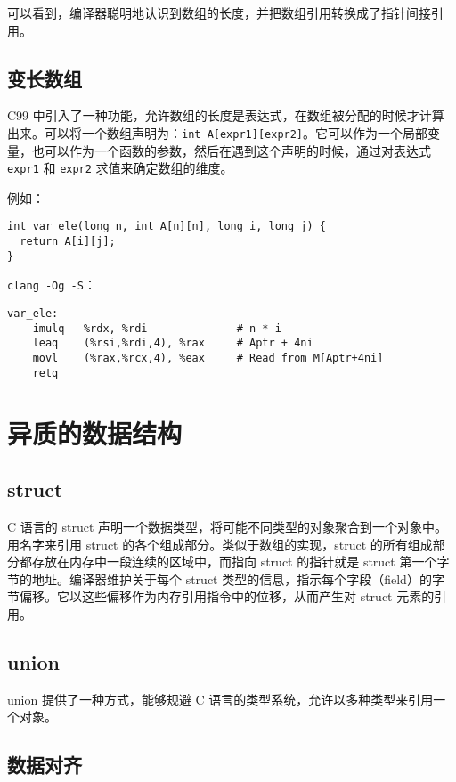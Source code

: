 可以看到，编译器聪明地认识到数组的长度，并把数组引用转换成了指针间接引用。

\subsection{变长数组}

C99 中引入了一种功能，允许数组的长度是表达式，在数组被分配的时候才计算出来。可以将一个数组声明为：\verb|int A[expr1][expr2]|。它可以作为一个局部变量，也可以作为一个函数的参数，然后在遇到这个声明的时候，通过对表达式 \verb|expr1| 和 \verb|expr2| 求值来确定数组的维度。

例如：
\begin{verbatim}
int var_ele(long n, int A[n][n], long i, long j) {
  return A[i][j];
}
\end{verbatim}
\verb|clang -Og -S|：
\begin{verbatim}
var_ele:
    imulq   %rdx, %rdi              # n * i
    leaq    (%rsi,%rdi,4), %rax     # Aptr + 4ni
    movl    (%rax,%rcx,4), %eax     # Read from M[Aptr+4ni]
    retq
\end{verbatim}

\section{异质的数据结构}

\subsection{struct}

C 语言的 struct 声明一个数据类型，将可能不同类型的对象聚合到一个对象中。用名字来引用 struct 的各个组成部分。类似于数组的实现，struct 的所有组成部分都存放在内存中一段连续的区域中，而指向 struct 的指针就是 struct 第一个字节的地址。编译器维护关于每个 struct 类型的信息，指示每个字段（field）的字节偏移。它以这些偏移作为内存引用指令中的位移，从而产生对 struct 元素的引用。

\subsection{union}

union 提供了一种方式，能够规避 C 语言的类型系统，允许以多种类型来引用一个对象。

\subsection{数据对齐}

